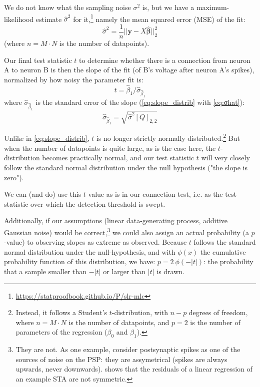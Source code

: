 We do not know what the sampling noise $σ^2$ is, but we have a maximum-likelihood estimate $\hat{σ}^2$ for it,\footnote{\url{https://statproofbook.github.io/P/slr-mle}} namely the mean squared error (MSE) of the fit:
\begin{equation}\label{eq:σhat}
    \hat{σ}^2 = \frac{1}{n} || \bm{y} - X \bm{\hat{β}} ||_2^2
\end{equation}
(where $n = M · N$ is the number of datapoints).

Our final test statistic $t$ to determine whether there is a connection from neuron A
to neuron B is then the slope of the fit (of B's voltage after neuron A's spikes), normalized by how noisy the parameter fit is:
\begin{equation} \label{eq:linreg-tstat}
    t = \hat{β}_1 / \hat{σ}_{\hat{β}_1}
\end{equation}
where $\hat{σ}_{\hat{β}_1}$ is the standard error of the slope (\cref{eq:slope_distrib} with \cref{eq:σhat}):
\begin{equation} \label{eq:linreg-stderr-β}
    \hat{σ}_{\hat{β}_1} = \sqrt{\hat{σ}^2 [Q]_{2,2}}
\end{equation}

Unlike in \cref{eq:slope_distrib}, $t$ is no longer strictly normally distributed.\footnote{
    Instead, it follows a Student's $t$-distribution, with $n - p$ degrees of freedom, where $n = M · N$ is the number of datapoints, and $p = 2$ is the number of parameters of the regression ($β_0$ and $β_1$).
}
But when the number of datapoints is quite large, as is the case here, the $t$-distribution becomes practically normal, and our test statistic $t$ will very closely follow the standard normal distribution under the null hypothesis ("the slope is zero").

We can (and do) use this $t$-value as-is in our connection test, i.e. as the test statistic over which the detection threshold is swept.

Additionally, if our assumptions (linear data-generating process, additive Gaussian noise) would be correct,\footnote{They are not. As one example, consider postsynaptic spikes as one of the sources of noise on the PSP: they are assymetrical (spikes are always upwards, never downwards).  shows that the residuals of a linear regression of an example STA are not symmetric.}
we could also assign an actual probability (a $p$-value) to observing slopes as extreme as observed. Because $t$ follows the standard normal distribution under the null-hypothesis, and with $\phi(x)$ the cumulative probability function of this distribution, we have: $p = 2\ \phi(-|t|)$: the probability that a sample smaller than $-|t|$ or larger than $|t|$ is drawn.

